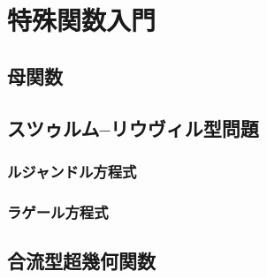 \chapter{特殊関数入門}
%
\section{母関数}
%
\section{スツゥルム–リウヴィル型問題}
%
\subsection{ルジャンドル方程式}
%
\subsection{ラゲール方程式}
%
\section{合流型超幾何関数}